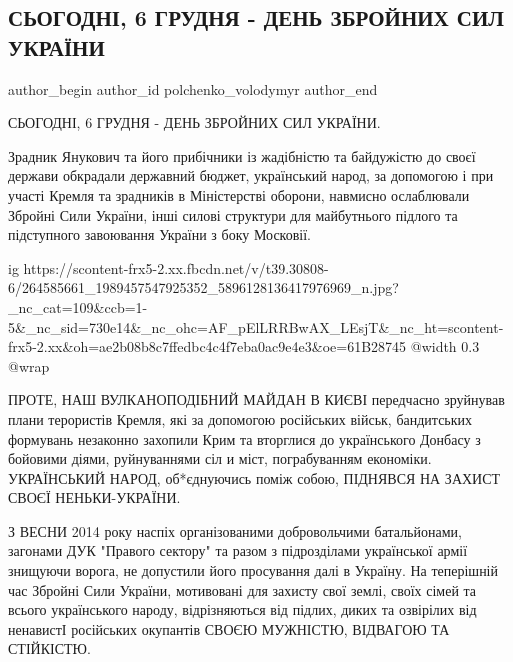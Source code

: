  
 
 
 
 
 
\subsection{СЬОГОДНІ, 6 ГРУДНЯ - ДЕНЬ ЗБРОЙНИХ СИЛ УКРАЇНИ}
\label{sec:06_12_2021.fb.polchenko_volodymyr.1.den_zsu}
 
\ifcmt
 author_begin
   author_id polchenko_volodymyr
 author_end
\fi

СЬОГОДНІ, 6 ГРУДНЯ - ДЕНЬ ЗБРОЙНИХ СИЛ УКРАЇНИ. 

Зрадник Янукович та його прибічники із жадібністю та байдужістю до
своєї держави обкрадали державний бюджет, український народ, за
допомогою і при участі Кремля та зрадників в Міністерстві оборони,
навмисно ослаблювали Збройні Сили України, інші силові структури для
майбутнього підлого та підступного завоювання України з боку Московії. 

\ifcmt
  ig https://scontent-frx5-2.xx.fbcdn.net/v/t39.30808-6/264585661_1989457547925352_5896128136417976969_n.jpg?_nc_cat=109&ccb=1-5&_nc_sid=730e14&_nc_ohc=AF_pElLRRBwAX_LEsjT&_nc_ht=scontent-frx5-2.xx&oh=ae2b08b8c7ffedbc4c4f7eba0ac9e4e3&oe=61B28745
  @width 0.3
  @wrap 
\fi

ПРОТЕ, НАШ ВУЛКАНОПОДІБНИЙ МАЙДАН В КИЄВІ передчасно зруйнував
плани терористів Кремля, які за допомогою російських військ,
бандитських формувань незаконно захопили Крим та вторглися до
українського Донбасу з бойовими діями, руйнуваннями сіл и міст,
пограбуванням економіки. УКРАЇНСЬКИЙ НАРОД, об*єднуючись поміж
собою, ПІДНЯВСЯ НА ЗАХИСТ СВОЄЇ НЕНЬКИ-УКРАЇНИ. 

З ВЕСНИ 2014 року наспіх організованими добровольчими батальйонами, загонами
ДУК "Правого сектору" та разом з підрозділами української армії знищуючи
ворога, не допустили його просування далі в Україну. На теперішній час Збройні
Сили України, мотивовані для захисту свої землі, своїх сімей та всього
українського народу, відрізняються від підлих, диких та озвірілих від ненавистІ
російських окупантів СВОЄЮ МУЖНІСТЮ, ВІДВАГОЮ ТА СТІЙКІСТЮ. 

